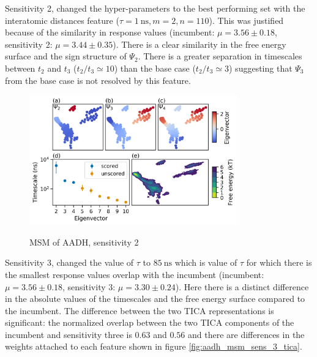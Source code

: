 Sensitivity 2, changed the hyper-parameters to the best performing set with the interatomic distances feature ($\tau = \SI{1}{\nano\second}, m=2, n=110$). This was justified because of the similarity in response values (incumbent: $\mu=3.56 \pm 0.18$, sensitivity 2: $\mu=3.44 \pm 0.35$). There is a clear similarity in the free energy surface and the sign structure of $\Psi_{2}$. There is a greater separation in timescales between $t_{2}$ and $t_{3}$ ($t_{2}/t_{3} \simeq 10$) than the base case ($t_{2}/t_{3} \simeq 3$) suggesting that $\Psi_{3}$ from the base case is not resolved by this feature. 
\begin{figure}
    \centering
    \caption{MSM of AADH, sensitivity 2}
    \includegraphics[width=0.8\textwidth]{chapters/msm_optimization/figures/aadh_msm_sens_2.png}
    \label{fig:aadh_msm_sens_2}
\end{figure}
Sensitivity 3, changed the value of $\tau$ to $\SI{85}{\nano\second}$ which is value of $\tau$ for which there is the smallest response values overlap with the incumbent (incumbent: $\mu=3.56 \pm 0.18$, sensitivity 3: $\mu=3.30 \pm 0.24$).  Here there is a distinct difference in the absolute values of the timescales and the free energy surface compared to the incumbent. The difference between the two TICA representations is significant: the normalized overlap between the two TICA components of the incumbent and sensitivity three is $0.63$ and $0.56$ and there are  differences in the weights attached to each feature shown in figure \ref{fig:aadh_msm_sens_3_tica}. 

